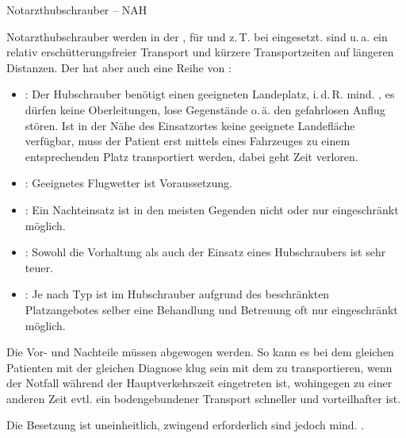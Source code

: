 \TextSlideTeaser
{Notarzthubschrauber -- NAH}%
{%
%
%
%
Notarzthubschrauber werden in der , für
 und z.\,T. bei  eingesetzt.
 sind u.\,a. ein relativ erschütterungsfreier
Transport und kürzere Transportzeiten auf längeren Distanzen.
Der  hat aber auch eine Reihe von :

\begin{itemize}
  \item {}: Der Hubschrauber benötigt einen
  geeigneten Landeplatz, i.\,d.\,R. mind.
  , es dürfen keine Oberleitungen, lose Gegenstände
  o.\,ä. den gefahrlosen Anflug stören. Ist in der Nähe des
  Einsatzortes keine geeignete Landefläche verfügbar, muss der
  Patient erst mittels eines Fahrzeuges zu einem
  entsprechenden Platz transportiert werden, dabei geht Zeit
  verloren.
  \item {}: Geeignetes Flugwetter ist
  Voraussetzung.
  \item {}: Ein Nachteinsatz ist in den
  meisten Gegenden nicht oder nur
  eingeschränkt möglich.
  \item {}: Sowohl die Vorhaltung als auch der
  Einsatz eines Hubschraubers ist sehr teuer.
  \item {}: Je nach Typ ist im Hubschrauber aufgrund
  des beschränkten Platzangebotes selber
eine Behandlung und Betreuung oft nur eingeschränkt möglich.
\end{itemize}

Die Vor- und Nachteile müssen abgewogen werden. So kann es
bei dem gleichen Patienten mit der gleichen Diagnose klug
sein mit dem  zu transportieren, wenn der Notfall
während der Hauptverkehrszeit eingetreten ist, wohingegen zu
einer anderen Zeit evtl. ein bodengebundener Transport
schneller und vorteilhafter ist.



Die Besetzung ist uneinheitlich, zwingend erforderlich sind
jedoch mind. .}%
